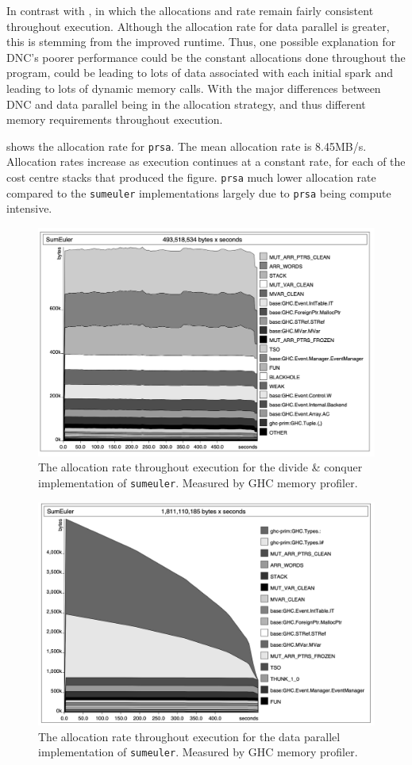\documentclass{paper}\usepackage{graphicx}
\begin{document}
In contrast with , in which the allocations and rate remain fairly consistent throughout execution. Although the allocation rate for data parallel is greater, this is stemming from the improved runtime. Thus, one possible explanation for DNC's poorer performance could be the constant allocations done throughout the program, could be leading to lots of data associated with each initial spark and leading to lots of dynamic memory calls. With the major differences between DNC and data parallel being in the allocation strategy, and thus different memory requirements throughout execution.

 shows the allocation rate for \lstinline{prsa}. The mean allocation rate is 8.45MB/s. Allocation rates increase as execution continues at a constant rate, for each of the cost centre stacks that produced the figure. \lstinline{prsa} much lower allocation rate compared to the \lstinline{sumeuler} implementations largely due to \lstinline{prsa} being compute intensive.

\begin{figure}[!htb]
    \centering
    \includegraphics[width=0.75\linewidth]{Paper/images/sumeuler/divconq_hp.png}
    \caption{The allocation rate throughout execution for the divide \& conquer implementation of \lstinline{sumeuler}. Measured by GHC memory profiler.}
    \label{fig:divconq_hp}
\end{figure}

\begin{figure}[!htb]
    \centering
    \includegraphics[width=0.75\linewidth]{Paper/images/sumeuler/dp_hp.png}
    \caption{The allocation rate throughout execution for the data parallel implementation of \lstinline{sumeuler}. Measured by GHC memory profiler.}
    \label{fig:dp_hp}
\end{figure}
\end{document}
